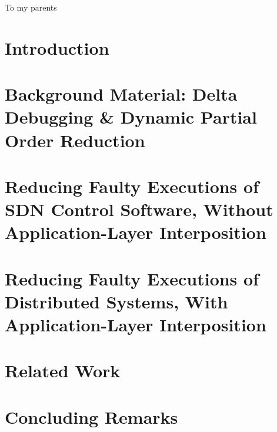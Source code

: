 

\begin{abstract}

\end{abstract}

\begin{frontmatter}

\begin{dedication}
\null\vfil
{\large
\begin{center}
To my parents
\end{center}}
\null\vfil
\end{dedication}

\tableofcontents
\listoffigures %
\listoftables %

\makeatletter
\let\@currsize\normalsize
\makeatother
{}
\setlength{\parskip}{.25\baselineskip}%



\end{frontmatter}

\makeatletter
\let\@currsize\normalsize
\makeatother
{}
\setlength{\parskip}{.25\baselineskip}%

\chapter{Introduction}
\label{sec:intro}


\chapter{Background Material: Delta Debugging \& Dynamic Partial Order
Reduction}
\label{sec:background_material}


\chapter{Reducing Faulty Executions of SDN Control Software, Without Application-Layer Interposition}
\label{sec:sts}


\chapter{Reducing Faulty Executions of Distributed Systems, With Application-Layer Interposition}
\label{sec:demi}


\chapter{Related Work}
\label{sec:related_work}


\chapter{Concluding Remarks}
\label{main_sec:conclusion}


%

%


\printbibliography


